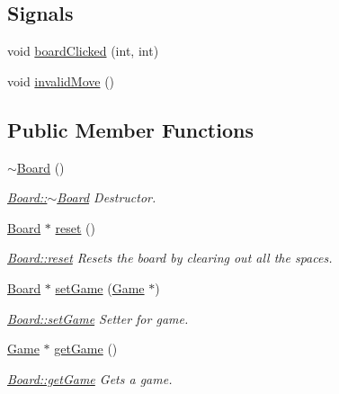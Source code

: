 \subsection*{Signals}
\begin{DoxyCompactItemize}
\item 
void \hyperlink{class_board_a4149ab29681bf6745ef51e18a389aad3}{board\-Clicked} (int, int)
\item 
void \hyperlink{class_board_a8333b50e98ce792ebd3afe551751ce56}{invalid\-Move} ()
\end{DoxyCompactItemize}
\subsection*{Public Member Functions}
\begin{DoxyCompactItemize}
\item 
\hyperlink{class_board_af73f45730119a1fd8f6670f53f959e68}{$\sim$\-Board} ()
\begin{DoxyCompactList}\small\item\em \hyperlink{class_board_af73f45730119a1fd8f6670f53f959e68}{Board\-::$\sim$\-Board} Destructor. \end{DoxyCompactList}\item 
\hyperlink{class_board}{Board} $\ast$ \hyperlink{class_board_a13c88b0bc7d2a85f7e53790e71bdd403}{reset} ()
\begin{DoxyCompactList}\small\item\em \hyperlink{class_board_a13c88b0bc7d2a85f7e53790e71bdd403}{Board\-::reset} Resets the board by clearing out all the spaces. \end{DoxyCompactList}\item 
\hyperlink{class_board}{Board} $\ast$ \hyperlink{class_board_ae08098fe478e2832e7e7403140314164}{set\-Game} (\hyperlink{class_game}{Game} $\ast$)
\begin{DoxyCompactList}\small\item\em \hyperlink{class_board_ae08098fe478e2832e7e7403140314164}{Board\-::set\-Game} Setter for game. \end{DoxyCompactList}\item 
\hyperlink{class_game}{Game} $\ast$ \hyperlink{class_board_af09f0761a753008aa12021986ad6bc52}{get\-Game} ()
\begin{DoxyCompactList}\small\item\em \hyperlink{class_board_af09f0761a753008aa12021986ad6bc52}{Board\-::get\-Game} Gets a game. \end{DoxyCompactList}\item 

\end{DoxyCompactItemize}
